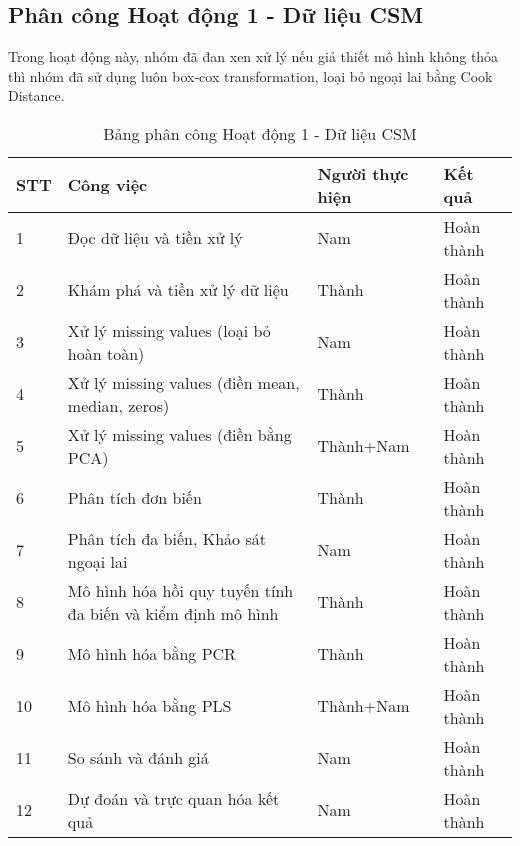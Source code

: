 \subsection{Phân công Hoạt động 1 - Dữ liệu CSM}

Trong hoạt động này, nhóm đã đan xen xử lý nếu giả thiết mô hình không thỏa thì nhóm đã sử dụng luôn box-cox transformation, loại bỏ ngoại lai bằng Cook Distance.

\begin{table}[H]
    \centering 
    \caption{Bảng phân công Hoạt động 1 - Dữ liệu CSM}
    \label{tab:phancong1}
    \begin{tabular}{|l|l|l|l|}
    \hline
    STT & Công việc                                                   & Người thực hiện & Kết quả    \\ \hline
    1   & Đọc dữ liệu và tiền xử lý                                   & Nam             & Hoàn thành \\ \hline
    2   & Khám phá và tiền xử lý dữ liệu                              & Thành           & Hoàn thành \\ \hline
    3   & Xử lý missing values (loại bỏ hoàn toàn)                    & Nam             & Hoàn thành \\ \hline
    4   & Xử lý missing values (điền mean, median, zeros)             & Thành           & Hoàn thành \\ \hline
    5   & Xử lý missing values (điền bằng PCA)                        & Thành+Nam       & Hoàn thành \\ \hline
    6   & Phân tích đơn biến                                          & Thành           & Hoàn thành \\ \hline
    7   & Phân tích đa biến, Khảo sát ngoại lai                       & Nam             & Hoàn thành \\ \hline
    8   & Mô hình hóa hồi quy tuyến tính đa biến và kiểm định mô hình & Thành           & Hoàn thành \\ \hline
    9   & Mô hình hóa bằng PCR                                        & Thành           & Hoàn thành \\ \hline
    10  & Mô hình hóa bằng PLS                                        & Thành+Nam       & Hoàn thành \\ \hline
    11  & So sánh và đánh giá                                         & Nam             & Hoàn thành \\ \hline
    12  & Dự đoán và trực quan hóa kết quả                            & Nam             & Hoàn thành \\ \hline
    \end{tabular}
\end{table}


